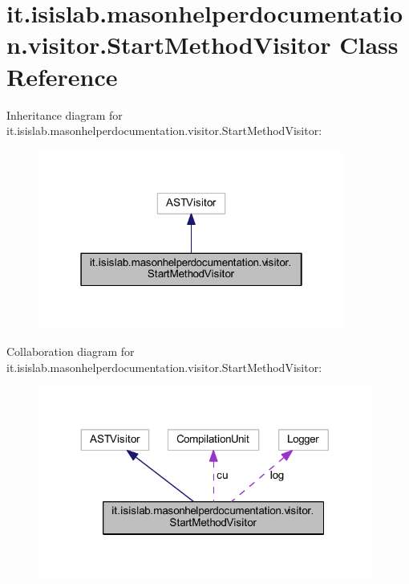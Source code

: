 \hypertarget{classit_1_1isislab_1_1masonhelperdocumentation_1_1visitor_1_1_start_method_visitor}{\section{it.\-isislab.\-masonhelperdocumentation.\-visitor.\-Start\-Method\-Visitor Class Reference}
\label{classit_1_1isislab_1_1masonhelperdocumentation_1_1visitor_1_1_start_method_visitor}
}


Inheritance diagram for it.\-isislab.\-masonhelperdocumentation.\-visitor.\-Start\-Method\-Visitor\-:\nopagebreak
\begin{figure}[H]
\begin{center}
\leavevmode
\includegraphics[width=286pt]{classit_1_1isislab_1_1masonhelperdocumentation_1_1visitor_1_1_start_method_visitor__inherit__graph}
\end{center}
\end{figure}


Collaboration diagram for it.\-isislab.\-masonhelperdocumentation.\-visitor.\-Start\-Method\-Visitor\-:\nopagebreak
\begin{figure}[H]
\begin{center}
\leavevmode
\includegraphics[width=311pt]{classit_1_1isislab_1_1masonhelperdocumentation_1_1visitor_1_1_start_method_visitor__coll__graph}
\end{center}
\end{figure}
